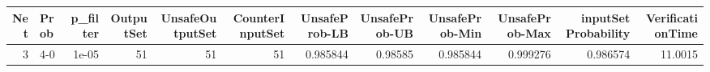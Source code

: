 \begin{tabular}{rlrrrrrrrrrr}
\hline
   Net & Prob   &   p\_filter &   OutputSet &   UnsafeOutputSet &   CounterInputSet &   UnsafeProb-LB &   UnsafeProb-UB &   UnsafeProb-Min &   UnsafeProb-Max &   inputSet Probability &   VerificationTime \\
\hline
     3 & 4-0    &      1e-05 &          51 &                51 &                51 &        0.985844 &         0.98585 &         0.985844 &         0.999276 &               0.986574 &            11.0015 \\
\hline
\end{tabular}
